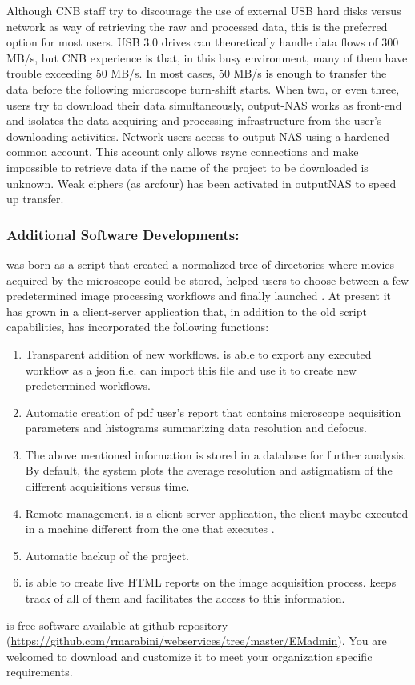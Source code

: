 Although CNB staff try to discourage the use of external USB hard disks versus network as way of retrieving the raw and processed data, this is the preferred option for most users.
USB 3.0 drives can theoretically handle data flows of 300 MB/s, but CNB experience is that, in this busy environment, many of them  have trouble exceeding 50 MB/s. In most cases, 50 MB/s is enough to transfer the data before the following microscope  turn-shift starts. When two, or even three, users try to download their
data simultaneously, output-NAS works as front-end and isolates the data
acquiring and processing infrastructure from the user's downloading activities.
Network users access to output-NAS using a hardened common account. This account only allows rsync connections and make impossible to retrieve data if the name of the project to be downloaded is unknown. Weak ciphers (as arcfour) has been activated in outputNAS to speed up transfer.

\subsubsection{Additional Software Developments: \emadmin}

\emadmin was born as a script that created a normalized tree of directories  
where movies acquired by the microscope could be stored, helped users to choose between a few predetermined image processing workflows and finally launched \scipion. At present it has grown in a client-server application that, in addition to the old script capabilities, has incorporated the following functions:

\begin{enumerate}
 \item Transparent addition of new workflows. \scipion is able to export any executed workflow as a json file. \emadmin can import this file and use it to create new predetermined workflows.
 \item  Automatic creation of pdf user's report that contains microscope acquisition parameters and histograms summarizing data resolution and defocus. 
 \item The above mentioned information is stored in a database for further analysis. By default, the system plots the  average resolution and astigmatism of the different acquisitions versus time.
 \item Remote management. \emadmin is a client server application, the client maybe executed in a machine different from the one that executes \scipion.
 \item Automatic backup of the \scipion project.
 \item \scipion is able to create live HTML reports on the image acquisition process. \emadmin keeps track of all of them and facilitates the access to this information.
\end{enumerate}

\emadmin is free software available at github repository (\url{https://github.com/rmarabini/webservices/tree/master/EMadmin}). You are welcomed to download and customize it to meet your organization specific requirements.

